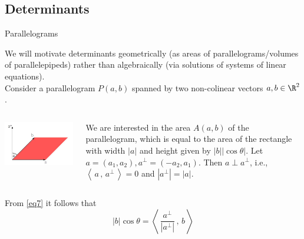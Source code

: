 \documentclass[smaller,hyperref={CJKbookmarks=true}]{beamer}
\newcommand{\scp}[2]{\left\langle\,#1\,,\,#2\,\right\rangle} \newcommand{\scpp}{\langle\,\cdot\,,\,\cdot\,\rangle}
\begin{document}
\subsection{Determinants}
\begin{frame}[c]
\begin{spacing}{2.5}
\tableofcontents[sectionstyle=hide,subsectionstyle=show/shaded/hide] \end{spacing}
\end{frame}
\begin{frame}[t,shrink]{Parallelograms}
\begin{spacing}{1.1}
We will motivate determinants geometrically (as areas of
parallelograms/volumes of parallelepipeds) rather than algebraically (via
solutions of systems of linear equations).\\[6pt]
Consider a parallelogram $P(a,b)$ spanned by two non-colinear vectors $a,b\in\R^2$.
\begin{columns}[onlytextwidth]
\begin{column}{0.35\textwidth}
\includegraphics[width=\columnwidth]{para.jpg}
\end{column}
\begin{column}{0.65\textwidth}
We are interested in the area $A(a,b)$ of the parallelogram, which is equal to the area of the rectangle with width $|a|$ and height given by $|b||\cos\theta|$. Let $a=(a_1,a_2),a^{\perp}=(-a_2,a_1)$. Then $a\perp a^{\perp}$, i.e., $\scp{a}{a^{\perp}}=0$ and $|a^{\perp}|=|a|$.
\end{column}
\end{columns}
\vspace*{5pt}
From \eqref{eq7} it follows that
\[|b|\cos\theta=\scp{\frac{a^{\perp}}{|a^{\perp}|}}{b}\]
\end{spacing}
\end{frame}
\end{document}

